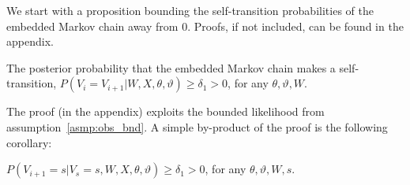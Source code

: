 We start with a proposition bounding the self-transition probabilities
of the embedded Markov chain away from $0$. Proofs, if not included, can 
be found in the appendix.
\begin{proposition}
The posterior probability that the embedded Markov chain makes a
self-transition,
$P(V_i = V_{i + 1} | W, X, \theta, \vartheta) \ge \delta_1 > 0$,
for %
any $\theta,\vartheta, W$.
\label{prop:self_tr}
\end{proposition}
The proof (in the appendix) exploits the bounded likelihood from 
assumption~\ref{asmp:obs_bnd}. A simple by-product of the proof is
the following corollary:
\begin{corollary}
$P(V_{i + 1} = s|V_s=s, W, X, \theta, \vartheta) \ge \delta_1 > 0$,
for %
any $\theta,\vartheta, W,s$.
\label{corol:self_tr}
\end{corollary}

